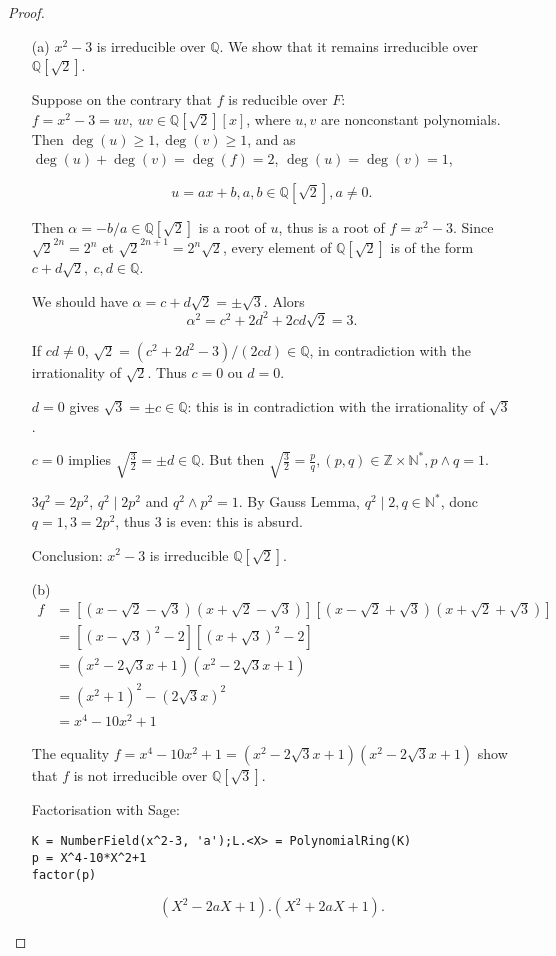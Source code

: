 \documentclass[11pt,a4paper]{article}
\begin{document}
\begin{proof}
\begin{enumerate}
\item[(a)]$x^2-3$ is irreducible over $\mathbb{Q}$. We show that it remains irreducible over $\mathbb{Q}[\sqrt{2}]$.

Suppose on the contrary that $f$ is reducible over $F$:  $f = x^2 - 3 = u v,\ u v \in \mathbb{Q}[\sqrt{2}][x]$, where $u,v$ are nonconstant polynomials. Then $\deg(u)\geq 1, \deg(v) \geq 1$, and as $\deg(u) + \deg(v) = \deg(f) = 2$, $\deg(u) = \deg(v)=1$, 

$$u = ax+b, a,b\in \mathbb{Q}[\sqrt{2}], a\neq 0.$$

Then $\alpha = -b/a \in \mathbb{Q}[\sqrt{2}]$ is a root of $u$, thus is a root of $f = x^2-3$. Since $\sqrt{2}^{2n} = 2^n$ et $\sqrt{2}^{2n+1} = 2^n \sqrt{2}$, every element of $\mathbb{Q}[\sqrt{2}]$  is of the form $c+ d\sqrt{2} , \ c,d \in \mathbb{Q}$.

We should have $\alpha = c + d \sqrt{2} = \pm \sqrt{3}. $
Alors $$\alpha^2 = c^2+2d^2  +2cd\sqrt{2}=3.$$

If $cd\neq 0$, $\sqrt{2} = (c^2+2d^2 -3)/(2cd) \in \mathbb{Q}$, in contradiction with the irrationality of $\sqrt{2}$. Thus $c=0$ ou $d=0$.

$d=0$ gives $\sqrt{3} = \pm c \in \mathbb{Q}$: this is in contradiction with the irrationality of $\sqrt{3}$.

$c=0$ implies $\sqrt{\frac{3}{2}} = \pm d \in \mathbb{Q}$. But then $\sqrt{\frac{3}{2}} =\frac{p}{q}, (p,q) \in \mathbb{Z} \times \mathbb{N}^*, p\wedge q=1$.

$3q^2 = 2 p^2$, $q^2 \mid 2 p^2$ and $q^2 \wedge p^2 = 1$. By Gauss Lemma, $q^2 \mid 2, q\in \mathbb{N}^*$, donc $q=1, 3 = 2p^2$, thus $3$ is even: this is absurd.

Conclusion: $x^2-3$ is irreducible $\mathbb{Q}[\sqrt{2}]$.


\item[(b)]
\begin{align*}
 f&= [(x-\sqrt{2} - \sqrt{3})(x+\sqrt{2} -\sqrt{3})] [(x-\sqrt{2} + \sqrt{3})(x+\sqrt{2} + \sqrt{3})]\\
&=[(x-\sqrt{3})^2-2][(x+\sqrt{3})^2-2]\\
&= (x^2 -2\sqrt{3} x +1)(x^2 -2\sqrt{3} x +1)\\
&= (x^2+1)^2 - (2\sqrt{3}x)^2\\
&=x^4 -10x^2 +1
\end{align*}

The equality $f = x^4 -10x^2 +1 = (x^2 -2\sqrt{3} x +1)(x^2 -2\sqrt{3} x +1)$ show that $f$ is not irreducible over $\mathbb{Q}[\sqrt{3}]$.

{\bigskip}

Factorisation with Sage:
\begin{verbatim}
K = NumberField(x^2-3, 'a');L.<X> = PolynomialRing(K)
p = X^4-10*X^2+1
factor(p)
\end{verbatim}
$$(X^2-2aX+1).(X^2+2aX+1).$$
\end{enumerate}
\end{proof}
\end{document}
